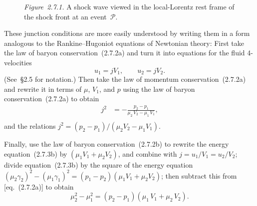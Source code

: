 
\begin{figure}[htbp]
\centering
\caption{\textit{Figure~2.7.1.}  A shock wave viewed in the local-Lorentz
rest frame of the shock front at an event~$\mathscr{P}$.}
\label{fig:2.7.1}
\end{figure}

These junction conditions are more easily understood by writing them in a
form analogous to the Rankine--Hugoniot equations of Newtonian theory:
First take the law of baryon conservation~(2.7.2a) and turn it into equations
for the fluid 4-velocities
%
\begin{equation}
\tag{2.7.3a}
u_1 = jV_1, \qquad u_2 = jV_2.
\end{equation}
%
(See~\S2.5 for notation.)  Then take the law of momentum conservation~(2.7.2a)
and rewrite it in terms of $\mu$, $V_1$, and $p$ using the law of baryon
conservation~(2.7.2a) to obtain
%
\begin{subequations}
\begin{align}
\tag{2.7.3b}
j^2 &= -\frac{p_2 - p_1}{\mu_2\,V_2 - \mu_1\,V_1},\\[6pt]
\end{align}
\end{subequations}
%
and the relations
$j^2 = (p_2-p_1)/(\mu_2 V_2 - \mu_1 V_1)$.

Finally, use the law of baryon conservation~(2.7.2b) to rewrite the energy
equation~(2.7.3b) by $(\mu_1 V_1 + \mu_2 V_2)$, and combine with
$j = u_1/V_1 = u_2/V_2$; divide equation~(2.7.3b) by the square of the energy
equation $(\mu_2\gamma_2)^2 - (\mu_1\gamma_1)^2 = (p_1 - p_2)(\mu_1 V_1 + \mu_2 V_2)$;
then subtract this from [eq.~(2.7.2a)] to obtain
%
\begin{equation}
\tag{2.7.3c}
\mu_2^2 - \mu_1^2 = (p_2 - p_1)(\mu_1\,V_1 + \mu_2\,V_2).
\end{equation}

